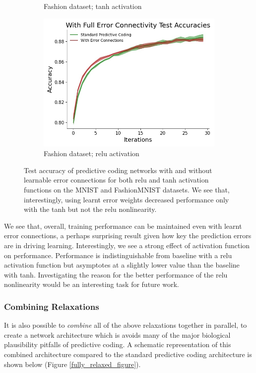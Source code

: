 \begin{figure}[ht]
\begin{subfigure}[b]{0.5\linewidth}
    \caption{\small Fashion dataset; tanh activation} 
  \end{subfigure}%
  \begin{subfigure}[b]{0.5\linewidth}
    \centering
    \includegraphics[width=0.75\linewidth]{chapter_3_figures/fashion_relu_With_Full_Error_Connectivity_Test_Accuracies_prelim_2.jpg} 
    \caption{\small Fashion dataset; relu activation} 
  \end{subfigure} 
  \caption{Test accuracy of predictive coding networks with and without learnable error connections for both relu and tanh activation functions on the MNIST and FashionMNIST datasets. We see that, interestingly, using learnt error weights decreased performance only with the tanh but not the relu nonlinearity.}
\end{figure} 
We see that, overall, training performance can be maintained even with learnt error connections, a perhaps surprising result given how key the prediction errors are in driving learning. Interestingly, we see a strong effect of activation function on performance. Performance is indistinguishable from baseline with a relu activation function but asymptotes at a slightly lower value than the baseline with tanh. Investigating the reason for the better performance of the relu nonlinearity would be an interesting task for future work.

\subsubsection{Combining Relaxations}

It is also possible to \emph{combine} all of the above relaxations together in parallel, to create a network architecture which is avoids many of the major biological plausibility pitfalls of predictive coding. A schematic representation of this combined architecture compared to the standard predictive coding architecture is shown below (Figure \ref{fully_relaxed_figure}).

